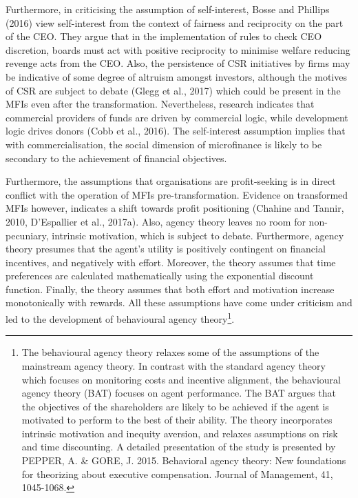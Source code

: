 \documentclass[a4paper, nobind]{templates/ociamthesis}
\begin{document}
Furthermore, in criticising the assumption of self-interest, Bosse and Phillips (2016) view self-interest from the context of fairness and reciprocity on the part of the CEO. They argue that in the implementation of rules to check CEO discretion, boards must act with positive reciprocity to minimise welfare reducing revenge acts from the CEO. Also, the persistence of CSR initiatives by firms may be indicative of some degree of altruism amongst investors, although the motives of CSR are subject to debate (Glegg et al., 2017) which could be present in the MFIs even after the transformation. Nevertheless, research indicates that commercial providers of funds are driven by commercial logic, while development logic drives donors (Cobb et al., 2016). The self-interest assumption implies that with commercialisation, the social dimension of microfinance is likely to be secondary to the achievement of financial objectives.

Furthermore, the assumptions that organisations are profit-seeking is in direct conflict with the operation of MFIs pre-transformation. Evidence on transformed MFIs however, indicates a shift towards profit positioning (Chahine and Tannir, 2010, D'Espallier et al., 2017a). Also, agency theory leaves no room for non-pecuniary, intrinsic motivation, which is subject to debate. Furthermore, agency theory presumes that the agent's utility is positively contingent on financial incentives, and negatively with effort. Moreover, the theory assumes that time preferences are calculated mathematically using the exponential discount function. Finally, the theory assumes that both effort and motivation increase monotonically with rewards. All these assumptions have come under criticism and led to the development of behavioural agency theory\footnote{The behavioural agency theory relaxes some of the assumptions of the mainstream agency theory. In contrast with the standard agency theory which focuses on monitoring costs and incentive alignment, the behavioural agency theory (BAT) focuses on agent performance. The BAT argues that the objectives of the shareholders are likely to be achieved if the agent is motivated to perform to the best of their ability. The theory incorporates intrinsic motivation and inequity aversion, and relaxes assumptions on risk and time discounting. A detailed presentation of the study is presented by PEPPER, A. \& GORE, J. 2015. Behavioral agency theory: New foundations for theorizing about executive compensation. Journal of Management, 41, 1045-1068.}.
\end{document}
